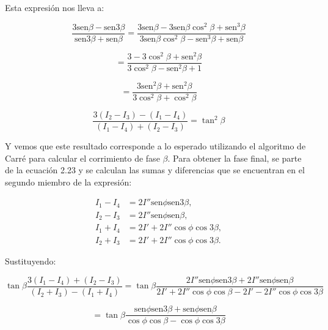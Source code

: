 \documentclass[12pt,letterpaper]{article}
\begin{document}
\begin{enumerate}
		Esta expresión nos lleva a:
		
		\begin{equation}
			\frac{3\text{sen}\beta - \text{sen}3\beta}{\text{sen}3\beta + \text{sen}\beta} = \frac{3\text{sen}\beta - 3\text{sen}\beta\cos^2\beta + \text{sen}^3\beta}{3\text{sen}\beta\cos^2\beta - \text{sen}^3\beta + \text{sen}\beta}
		\end{equation}
		
		\begin{equation}
			= \frac{3 - 3\cos^2\beta + \text{sen}^2\beta}{3\cos^2\beta - \text{sen}^2\beta + 1}
		\end{equation}
		
		\begin{equation}
			= \frac{3\text{sen}^2\beta + \text{sen}^2\beta}{3\cos^2\beta + \cos^2\beta}
		\end{equation}
		
		\begin{equation}
			\frac{3(I_2 - I_3) - (I_1 - I_4)}{(I_1 - I_4) + (I_2 - I_3)} = \tan^2\beta
		\end{equation}
		
		Y vemos que este resultado corresponde a lo esperado utilizando el algoritmo de Carré para calcular el corrimiento de fase $\beta$. Para obtener la fase final, se parte de la ecuación 2.23 y se calculan las sumas y diferencias que se encuentran en el segundo miembro de la expresión:
		
		\begin{equation}
			\begin{aligned}
				I_1 - I_4 &= 2I''\text{sen}\phi\text{sen}3\beta, \\
				I_2 - I_3 &= 2I''\text{sen}\phi\text{sen}\beta, \\
				I_1 + I_4 &= 2I' + 2I''\cos\phi\cos3\beta, \\
				I_2 + I_3 &= 2I' + 2I''\cos\phi\cos3\beta.
			\end{aligned}
		\end{equation}
		
		Sustituyendo:
		
		\begin{equation}
			\tan\beta\frac{3(I_1 - I_4) + (I_2 - I_3)}{(I_2 + I_3) - (I_1 + I_4)} = \tan\beta\frac{2I''\text{sen}\phi\text{sen}3\beta + 2I''\text{sen}\phi\text{sen}\beta}{2I' + 2I''\cos\phi\cos\beta - 2I' - 2I''\cos\phi\cos3\beta}
		\end{equation}
		
		\begin{equation}
			= \tan\beta\frac{\text{sen}\phi\text{sen}3\beta + \text{sen}\phi\text{sen}\beta}{\cos\phi\cos\beta - \cos\phi\cos3\beta}
		\end{equation}
		

\end{enumerate}
\end{document}
